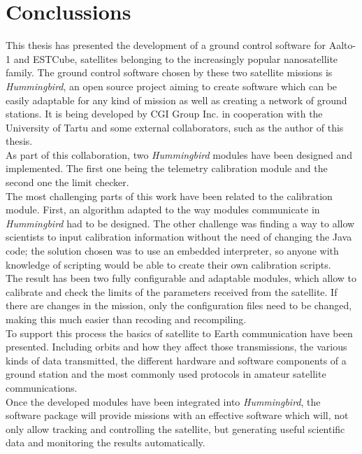 \chapter{Conclussions}

This thesis has presented the development of a ground control software for Aalto-1 and ESTCube, satellites belonging to the increasingly popular nanosatellite family. The ground control software chosen by these two satellite missions is \emph{Hummingbird}, an open source project aiming to create software which can be easily adaptable for any kind of mission as well as creating a network of ground stations. It is being developed by CGI Group Inc. in cooperation with the University of Tartu and some external collaborators, such as the author of this thesis.\\ 


As part of this collaboration, two \emph{Hummingbird} modules have been designed and implemented. The first one being the telemetry calibration module and the second one the limit checker.\\

The most challenging parts of this work have been related to the calibration module. First, an algorithm adapted to the way modules communicate in \emph{Hummingbird} had to be designed. The other challenge was finding a way to allow scientists to input calibration information without the need of changing the Java code; the solution chosen was to use an embedded  interpreter, so anyone with knowledge of scripting would be able to create their own calibration scripts.\\

The result has been two fully configurable and adaptable modules, which allow to calibrate and check the limits of the parameters received from the satellite. If there are changes in the mission, only the configuration files need to be changed, making this much easier than recoding and recompiling.\\

To support this process the basics of satellite to Earth communication have been presented. Including orbits and how they affect those transmissions, the various kinds of data transmitted, the different hardware and software components of a ground station and the most commonly used protocols in amateur satellite communications.\\

Once the developed modules have been integrated into \emph{Hummingbird}, the software package will provide missions with an effective software which will, not only allow tracking and controlling the satellite, but generating useful scientific data and monitoring the results automatically.\\


\newpage